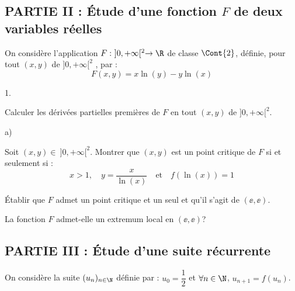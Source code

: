 

\subsection*{PARTIE II : Étude d'une fonction $F$ de deux 
variables réelles}

\noindent
On considère l'application $F: \ ]0,+\infty[^2 \to \R$ de 
classe $\Cont{2}$, définie, pour tout $(x,y)$ de $]0,+\infty[^2$ , par 
: 
\[
F(x,y)=x\ln(y)-y\ln(x)
\]
\begin{noliste}{1.}
  \setlength{\itemsep}{2mm} %
  \setcounter{enumi}{5}
\item Calculer les dérivées partielles premières de $F$ en tout
  $(x,y)$ de $]0,+\infty[^2$.

  
  

\item
\begin{noliste}{a)}
\item Soit $(x,y)\in \ ]0,+\infty[^2$. Montrer que $(x,y)$ est un point 
critique de $F$ si et seulement si :
\[
x > 1, \quad y=\dfrac{x}{\ln(x)} \quad \text{et} \quad 
f\left(\ln(x)\right)=1
\]




\item Établir que $F$ admet un point critique et un seul et qu'il
  s'agit de $(\ee,\ee)$.

  

\end{noliste}

\item La fonction $F$ admet-elle un extremum local en $(\ee,\ee)$?

  
  
\end{noliste}

\subsection*{PARTIE III : Étude d'une suite récurrente}

\noindent
On considère la suite $(u_n)_{n\in \N}$ définie par : $u_0 =
\dfrac{1}{2}$ \quad et \quad $\forall n\in \N$, $u_{n+1} = f(u_n)$.


